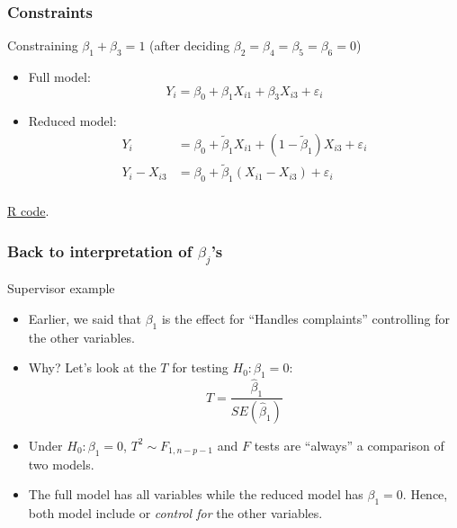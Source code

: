 \documentclass[handout]{beamer}
\begin{document}

   \begin{frame} \frametitle{Constraints}

   \begin{block}
   {Constraining $\beta_1+\beta_3=1$ (after deciding $\beta_2=\beta_4=\beta_5=\beta_6=0$)}
   \begin{itemize}
   \item Full model:
   $$
   Y_i = \beta_0 + \beta_1 X_{i1}  + \beta_3 X_{i3} + \varepsilon_i
   $$

   \item Reduced model:
   $$
   \begin{aligned}
   Y_i &= \beta_0 + \tilde{\beta}_1 X_{i1}  + (1 - \tilde{\beta}_1) X_{i3} + \varepsilon_i \\
   Y_i - X_{i3} &= \beta_0 + \tilde{\beta}_1 (X_{i1}  - X_{i3}) + \varepsilon_i \\
   \end{aligned}
   $$
   \end{itemize}
   \href{http://stats191.stanford.edu/multiple.html}{R code}.

   \end{block}
   \end{frame}


   \begin{frame} \frametitle{Back to interpretation of $\beta_j$'s}

   \begin{block}
   {Supervisor example}
   \begin{itemize}

   \item Earlier, we said that $\beta_1$ is the effect
   for  ``Handles complaints'' controlling for the other variables.

   \item Why? Let's look at the $T$ for testing $H_0:\beta_1=0$:
   $$
   T = \frac{\widehat{\beta}_1}{SE(\widehat{\beta}_1)}
   $$
   \item Under $H_0:\beta_1=0$, $T^2 \sim F_{1, n-p-1}$ and
   $F$ tests are ``always'' a comparison of two models.

   \item The full model has all variables while the reduced model
   has $\beta_1=0$. Hence, both model include or {\em control for}
   the other variables.

   \end{itemize}
   \end{block}
   \end{frame}


   \begin{frame} 

   \end{frame}

   
\end{document}
